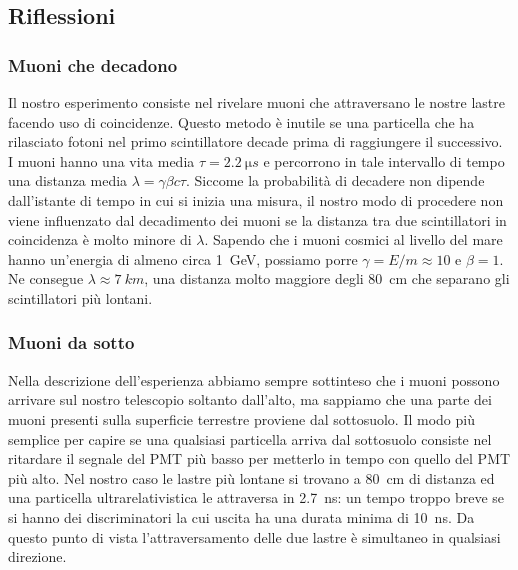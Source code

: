 \subsection{Riflessioni} 

\subsubsection{Muoni che decadono}

Il nostro esperimento consiste nel rivelare muoni che attraversano le nostre lastre facendo uso di coincidenze. Questo metodo è inutile se una particella che ha rilasciato fotoni nel primo scintillatore decade prima di raggiungere il successivo.  I muoni hanno una vita media $\tau=\SI{2.2}{\micro s}$ e percorrono in tale intervallo di tempo una distanza media $\lambda=\gamma\beta c\tau$. Siccome la probabilità di decadere non dipende dall'istante di tempo in cui si inizia una misura, il nostro modo di procedere non viene influenzato dal decadimento dei muoni se la distanza tra due scintillatori in coincidenza è molto minore di $\lambda$.
Sapendo che i muoni cosmici al livello del mare hanno un'energia di almeno circa \SI{1}{GeV}, possiamo porre $\gamma=E/m\approx10$ e $\beta=1$. Ne consegue $\lambda\approx\SI{7}{km}$, una distanza molto maggiore degli \SI{80}{cm} che separano gli scintillatori più lontani.

\subsubsection{Muoni da sotto}

Nella descrizione dell'esperienza abbiamo sempre sottinteso che i muoni possono arrivare sul nostro telescopio soltanto dall'alto, ma sappiamo che una parte dei muoni presenti sulla superficie terrestre proviene dal sottosuolo.
Il modo più semplice per capire se una qualsiasi particella arriva dal sottosuolo consiste nel ritardare il segnale del PMT più basso per metterlo in tempo con quello del PMT più alto. Nel nostro caso le lastre più lontane si trovano a \SI{80}{cm} di distanza ed una particella ultrarelativistica le attraversa in \SI{2.7}{ns}: un tempo troppo breve se si hanno dei discriminatori la cui uscita ha una durata minima di \SI{10}{ns}. Da questo punto di vista l'attraversamento delle due lastre è simultaneo in qualsiasi direzione.

